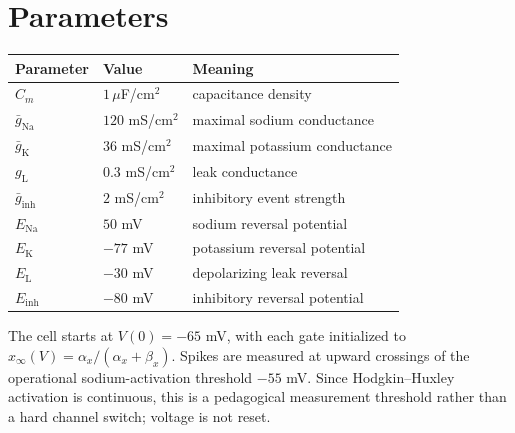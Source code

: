 \documentclass[11pt,a4paper]{article}
\begin{document}
\section*{Parameters}
\begin{center}
\begin{tabular}{lll}
\toprule
Parameter & Value & Meaning\\
\midrule
$C_m$ & $1\,\mu$F/cm$^2$ & capacitance density\\
$\bar g_{\mathrm{Na}}$ & $120$ mS/cm$^2$ & maximal sodium conductance\\
$\bar g_{\mathrm{K}}$ & $36$ mS/cm$^2$ & maximal potassium conductance\\
$g_{\mathrm{L}}$ & $0.3$ mS/cm$^2$ & leak conductance\\
$\bar g_{\mathrm{inh}}$ & $2$ mS/cm$^2$ & inhibitory event strength\\
$E_{\mathrm{Na}}$ & $50$ mV & sodium reversal potential\\
$E_{\mathrm{K}}$ & $-77$ mV & potassium reversal potential\\
$E_{\mathrm{L}}$ & $-30$ mV & depolarizing leak reversal\\
$E_{\mathrm{inh}}$ & $-80$ mV & inhibitory reversal potential\\
\bottomrule
\end{tabular}
\end{center}

The cell starts at $V(0)=-65$ mV, with each gate initialized to
$x_\infty(V)=\alpha_x/(\alpha_x+\beta_x)$. Spikes are measured at upward
crossings of the operational sodium-activation threshold $-55$ mV. Since
Hodgkin--Huxley activation is continuous, this is a pedagogical measurement
threshold rather than a hard channel switch; voltage is not reset.
\end{document}
